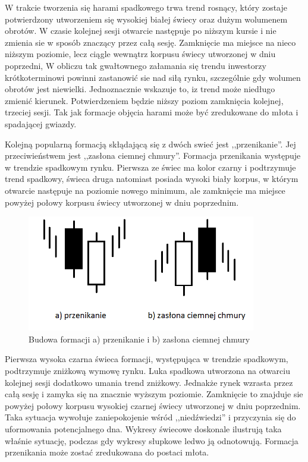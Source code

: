 \documentclass[pdflatex,11pt]{aghdpl}
\begin{document}
W trakcie tworzenia się harami spadkowego trwa trend rosnący, który zostaje potwierdzony utworzeniem się wysokiej białej świecy oraz dużym wolumenem obrotów. W czasie kolejnej sesji otwarcie następuje po niższym kursie i nie zmienia sie w sposób znaczący przez całą sesję. Zamknięcie ma miejsce na nieco niższym poziomie, lecz ciągle wewnątrz korpusu świecy utworzonej w dniu poprzedni, W obliczu tak gwałtownego załamania się trendu inwestorzy krótkoterminowi powinni zastanowić sie nad siłą rynku, szczególnie gdy wolumen obrotów jest niewielki. Jednoznacznie wskazuje to, iz trend może niedługo zmienić kierunek. Potwierdzeniem będzie niższy poziom zamknięcia kolejnej, trzeciej sesji. Tak jak formacje objęcia harami może być zredukowane do młota i spadającej gwiazdy. 

Kolejną popularną formacją skłądającą się z dwóch swieć jest ,,przenikanie''. Jej przeciwieństwem jest ,,zasłona ciemnej chmury''. Formacja przenikania występuje w trendzie spadkowym rynku. Pierwsza ze świec ma kolor czarny i podtrzymuje trend spadkowy, świeca druga natomiast posiada wysoki biały korpus, w którym otwarcie następuje na poziomie nowego minimum, ale zamknięcie ma miejsce powyżej połowy korpusu świecy utworzonej w dniu poprzednim. 
\begin{figure}[ht]
\begin{center}
\includegraphics[width=10cm]{piercing.png}
\caption{Budowa formacji a) przenikanie i b) zasłona ciemnej chmury}
\label{przenikanie}
\end{center}
\end{figure} 

Pierwsza wysoka czarna świeca formacji, występująca w trendzie spadkowym, podtrzymuje zniżkową wymowę rynku. Luka spadkowa utworzona na otwarciu kolejnej sesji dodatkowo umania trend zniżkowy. Jednakże rynek wzrasta przez całą sesję i zamyka się na znacznie wyższym poziomie. Zamknięcie to znajduje sie powyżej połowy korpusu wysokiej czarnej świecy utworzonej w dniu poprzednim. Taka sytuacja wywołuje zaniepokojenie wśród ,,niedźwiedzi'' i przyczynia się do uformowania potencjalnego dna. Wykresy świecowe doskonale ilustrują taka właśnie sytuację, podczas gdy wykresy słupkowe ledwo ją odnotowują. Formacja przenikania może zostać zredukowana do postaci młota.  
\end{document}
